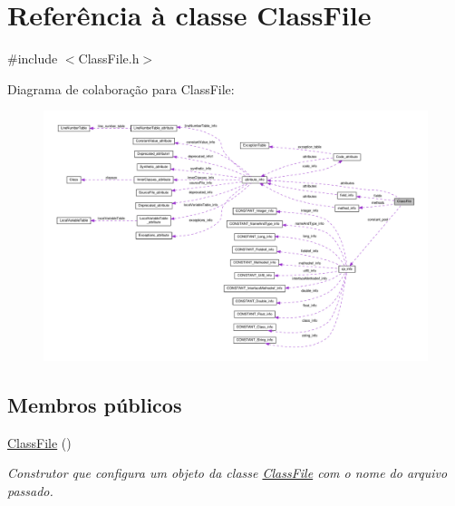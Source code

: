 \hypertarget{classClassFile}{}\section{Referência à classe Class\+File}
\label{classClassFile}


{\ttfamily \#include $<$Class\+File.\+h$>$}



Diagrama de colaboração para Class\+File\+:\nopagebreak
\begin{figure}[H]
\begin{center}
\leavevmode
\includegraphics[width=350pt]{classClassFile__coll__graph}
\end{center}
\end{figure}
\subsection*{Membros públicos}
\begin{DoxyCompactItemize}
\item 
\hyperlink{classClassFile_a47669d90346c9fa0db30ae582c74a199}{Class\+File} ()
\begin{DoxyCompactList}\small\item\em Construtor que configura um objeto da classe \hyperlink{classClassFile}{Class\+File} com o nome do arquivo passado. \end{DoxyCompactList}\end{DoxyCompactItemize}

